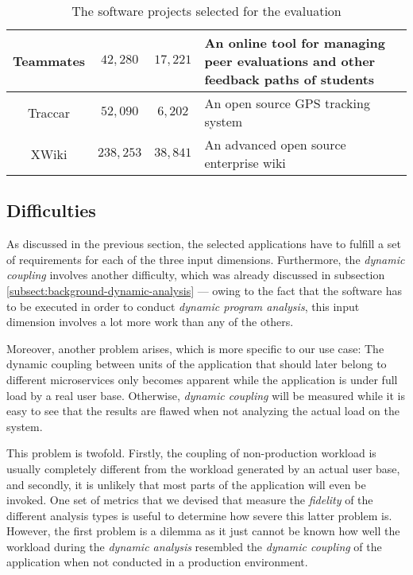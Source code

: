\documentclass[12pt,a4paper]{report}
\begin{document}
\begin{table}[ht!]
\begin{tabularx}{\textwidth}{|c|c|c|X|}
Teammates           & $42,280$  & $17,221$  &
An online tool for managing peer evaluations and other feedback paths of students \\\hline

Traccar             & $52,090$  & $6,202$   &
An open source GPS tracking system \\\hline

XWiki               & $238,253$ & $38,841$  &
An advanced open source enterprise wiki \\\hline

\end{tabularx}
\caption{The software projects selected for the evaluation}
\label{table:evaluation-projects}
\end{table}


\subsection{Difficulties} \label{subsect:difficulties}

As discussed in the previous section, the selected applications have to fulfill
a set of requirements for each of the three input dimensions. Furthermore, the
\textit{dynamic coupling} involves another difficulty, which was already
discussed in subsection \ref{subsect:background-dynamic-analysis} --- owing to
the fact that the software has to be executed in order to conduct \textit{
dynamic program analysis}, this input dimension involves a lot more work than
any of the others.

Moreover, another problem arises, which is more specific to our use case: The
dynamic coupling between units of the application that should later belong to
different microservices only becomes apparent while the application is under
full load by a real user base. Otherwise, \textit{dynamic coupling} will be
measured while it is easy to see that the results are flawed when not analyzing
the actual load on the system.

This problem is twofold. Firstly, the coupling of non-production workload is
usually completely different from the workload generated by an actual user
base, and secondly, it is unlikely that most parts of the application will even
be invoked. One set of metrics that we devised that measure the \textit{
fidelity} of the different analysis types is useful to determine how severe
this latter problem is. However, the first problem is a dilemma as it just
cannot be known how well the workload during the \textit{dynamic analysis}
resembled the \textit{dynamic coupling} of the application when not conducted
in a production environment.
\end{document}
